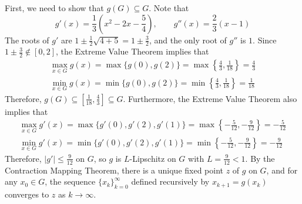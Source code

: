 \documentclass{homework}
\begin{document}
\question
First, we need to show that $g(G) \subseteq G$. Note that
\begin{equation}
	g'(x) = \frac{1}{3}\left(x^2 - 2x -\frac{5}{4}\right), \qquad g''(x) = \frac{2}{3}(x - 1)
\end{equation}
The roots of $g'$ are $1 \pm \frac{1}{2}\sqrt{4 + 5} = 1 \pm \frac{3}{2}$, and the only root of $g''$ is $1$. Since $1\pm \frac{3}{2} \notin [0,2]$, the Extreme Value Theorem implies that
\begin{gather}
	\max_{x\in G} g(x) = \max\{g(0), g(2)\} = \max\left\{\frac{4}{3}, \frac{1}{18}\right\} = \frac{4}{3}\\
	\min_{x\in G} g(x) = \min\{g(0), g(2)\} = \min\left\{\frac{4}{3},\frac{1}{18}\right\} = \frac{1}{18}
\end{gather}
Therefore, $g(G) \subseteq \left[\frac{1}{18},\frac{4}{3}\right]\subseteq G$. Furthermore, the Extreme Value Theorem also implies that
\begin{gather}
	\max_{x\in G} g'(x) = \max\{g'(0), g'(2), g'(1)\} = \max\left\{-\frac{5}{12},-\frac{9}{12}\right\} = -\frac{5}{12} \\
	\min_{x\in G} g'(x) = \min\{g'(0), g'(2), g'(1)\} = \min\left\{-\frac{5}{12},-\frac{9}{12}\right\} = -\frac{9}{12}
\end{gather}
Therefore, $|g'| \le \frac{9}{12}$ on $G$, so $g$ is $L$-Lipschitz on $G$ with $L = \frac{9}{12} < 1$. By the Contraction Mapping Theorem, there is a unique fixed point $z$ of $g$ on $G$, and for any $x_0 \in G$, the sequence $\{x_k\}_{k=0}^\infty$ defined recursively by $x_{k+1} = g(x_k)$ converges to $z$ as $k \to \infty$.
\end{document}
